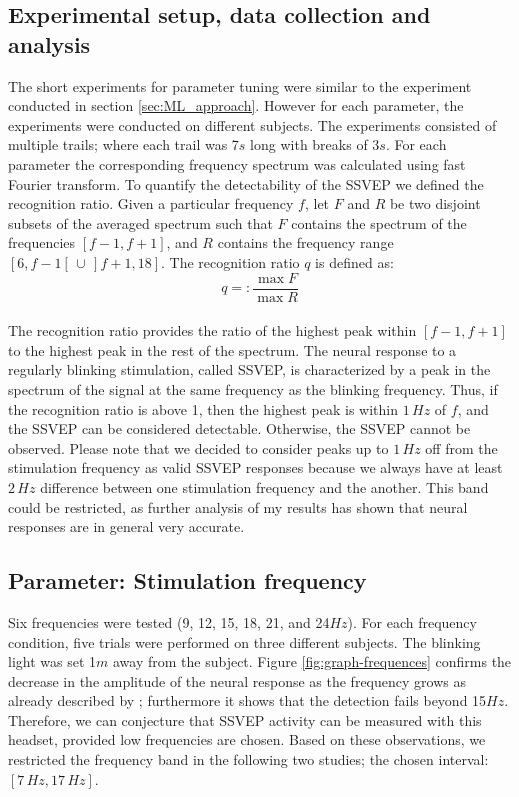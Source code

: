 \documentclass{svmult}
\begin{document}
\subsection{Experimental setup, data collection and analysis}
The short experiments for parameter tuning were similar to the experiment conducted in section \ref{sec:ML_approach}. However for each parameter, the experiments were conducted on different subjects. The experiments consisted of multiple trails; where each trail was 7$s$ long with breaks of 3$s$. For each parameter the corresponding frequency spectrum was calculated using fast Fourier transform. To quantify the detectability of the SSVEP we defined the recognition ratio. Given a particular frequency $f$, let $F$ and $R$ be two disjoint subsets of the averaged spectrum such that $F$ contains the spectrum of the frequencies $[f-1, f+1]$, and $R$ contains the frequency range $[6, f-1[ \,\cup\, ]f+1, 18]$. The recognition ratio $q$ is defined as:
\begin{equation}
\label{recog_rat}
q =:\frac{\max F}{\max R}
\end{equation}
\\
The recognition ratio provides the ratio of the highest peak within $[f-1, f+1]$ to the highest peak in the rest of the spectrum. The neural response to a regularly blinking stimulation, called SSVEP, is characterized by a peak in the spectrum of the signal at the same frequency as the blinking frequency. Thus, if the recognition ratio is above 1, then the highest peak is within $1\,\mathit{Hz}$ of $f$, and the SSVEP can be considered detectable. 
Otherwise, the SSVEP cannot be observed. 
Please note that we decided to consider peaks up to $1\,\mathit{Hz}$ off from the stimulation frequency as valid SSVEP responses because we always have at least $2\,\mathit{Hz}$ difference between one stimulation frequency and the another. This band could be restricted, as further analysis of my results has shown that neural responses are in general very accurate.

\subsection{Parameter: Stimulation frequency}
Six frequencies were tested (9, 12, 15, 18, 21, and 24$Hz$). For each frequency condition, five trials were performed on three different subjects. The blinking light was set 1$m$ away from the subject. Figure \ref{fig:graph-frequences} confirms the decrease in the amplitude of the neural response as the frequency grows as already described by \cite{herrmann2001}; furthermore it shows that the detection fails beyond 15$Hz$. Therefore, we can conjecture that SSVEP activity can be measured with this headset, provided low frequencies are chosen. Based on these observations, we restricted the frequency band in the following two studies; the chosen interval: $[7\,\mathit{Hz}, 17\,\mathit{Hz}]$.
\end{document}
